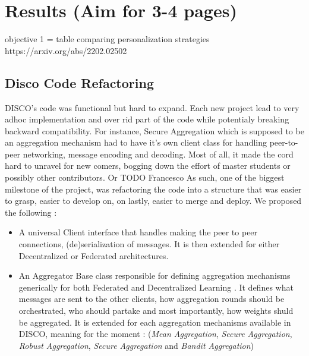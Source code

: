 \documentclass{article}
\begin{document}
\section{Results (Aim for 3-4 pages)}


objective 1 = table comparing personalization strategies 
https://arxiv.org/abs/2202.02502


\label{sec:results}
        \subsection{Disco Code Refactoring} 
        \label{sec:results1}
        DISCO's code was functional but hard to expand. Each new project lead to very adhoc implementation and over rid part of the code while potentialy breaking backward compatibility. For instance, Secure Aggregation which is supposed to be an aggregation mechanism had to have it's own client class for handling peer-to-peer networking, message encoding and decoding.
        Most of all, it made the cord hard to unravel for new comers, bogging down the effort of master students or possibly other contributors.
        Or TODO Francesco
        As such, one of the biggest milestone of the project, was refactoring the code into a structure that was easier to grasp, easier to develop on, on lastly, easier to merge and deploy.
        We proposed the following :
        \begin{itemize}
            \item A universal Client interface that handles making the peer to peer connections, (de)serialization of messages. It is then extended for either Decentralized or Federated architectures.
            \item An Aggregator Base class responsible for defining aggregation mechanisms generically for both Federated and Decentralized Learning . It defines what messages are sent to the other clients, how aggregation rounds should be orchestrated, who should partake and most importantly, how weights shuld be aggregated. It is extended for each aggregation mechanisms available in DISCO, meaning for the moment : (\textit{Mean Aggregation}, \textit{Secure Aggregation}, \textit{Robust Aggregation}, \textit{Secure Aggregation} and \textit{Bandit Aggregation})
            
        \end{itemize}
        

\end{document}
